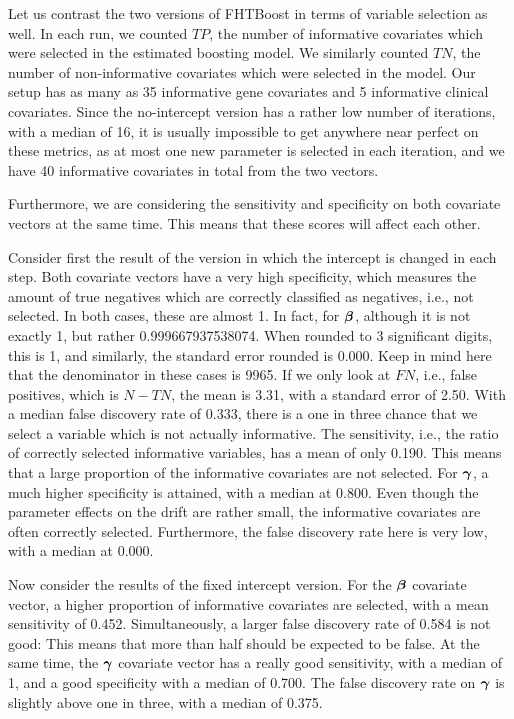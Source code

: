 Let us contrast the two versions of FHTBoost in terms of variable selection as well.
In each run, we counted $TP$, the number of informative covariates which were selected in the estimated boosting model.
We similarly counted $TN$, the number of non-informative covariates which were selected in the model.
Our setup has as many as 35 informative gene covariates and 5 informative clinical covariates.
Since the no-intercept version has a rather low number of iterations, with a median of 16, it is usually impossible to get anywhere near perfect on these metrics, as at most one new parameter is selected in each iteration, and we have 40 informative covariates in total from the two vectors.

Furthermore, we are considering the sensitivity and specificity on both covariate vectors at the same time.
This means that these scores will affect each other.

Consider first the result of the version in which the intercept is changed in each step.
Both covariate vectors have a very high specificity, which measures the amount of true negatives which are correctly classified as negatives, i.e., not selected.
In both cases, these are almost 1.
In fact, for $\boldsymbol{\beta}$, although it is not exactly 1, but rather 0.999667937538074.
When rounded to 3 significant digits, this is 1, and similarly, the standard error rounded is 0.000.
Keep in mind here that the denominator in these cases is 9965.
If we only look at $FN$, i.e., false positives, which is $N-TN$, the mean is 3.31, with a standard error of 2.50.
With a median false discovery rate of 0.333, there is a one in three chance that we select a variable which is not actually informative.
The sensitivity, i.e., the ratio of correctly selected informative variables, has a mean of only 0.190.
This means that a large proportion of the informative covariates are not selected.
For $\boldsymbol{\gamma}$, a much higher specificity is attained, with a median at 0.800.
Even though the parameter effects on the drift are rather small, the informative covariates are often correctly selected.
Furthermore, the false discovery rate here is very low, with a median at 0.000.

Now consider the results of the fixed intercept version.
For the $\boldsymbol{\beta}$ covariate vector, a higher proportion of informative covariates are selected, with a mean sensitivity of 0.452.
Simultaneously, a larger false discovery rate of 0.584 is not good: This means that more than half should be expected to be false.
At the same time, the $\boldsymbol{\gamma}$ covariate vector has a really good sensitivity, with a median of 1, and a good specificity with a median of 0.700.
The false discovery rate on $\boldsymbol{\gamma}$ is slightly above one in three, with a median of 0.375.


